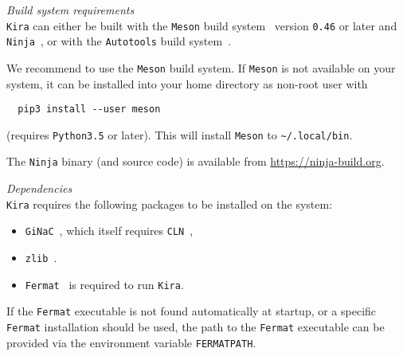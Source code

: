 \documentclass[11pt,a4paper,DIV=11,numbers=noenddot,parskip=half]{scrartcl}
\newcommand{\code}[1]{\texttt{#1}}
\newcommand*{\kira}{\code{Kira}}
\begin{document}
\medskip\pagebreak[2]
\noindent
\textit{Build system requirements}\smallskip\\
\kira{} can either be built with the \code{Meson} build system~\cite{Meson}
version \code{0.46} or later and \code{Ninja}~\cite{Ninja},
or with the \code{Autotools} build system~\cite{Autotools}.

We recommend to use the \code{Meson} build system.
If \code{Meson} is not available on your system, it can be installed into your home directory as non-root user with
\begin{verbatim}
  pip3 install --user meson
\end{verbatim}
(requires \code{Python}\;\code{3.5} or later).
This will install \code{Meson} to \code{\textasciitilde/.local/bin}.

The \code{Ninja} binary (and source code) is available from
\url{https://ninja-build.org}.


\medskip\pagebreak[2]
\noindent
\textit{Dependencies}\smallskip\\
\kira{} requires the following packages to be installed on the system:
%
\begin{itemize}
  \item \code{GiNaC}~\cite{GiNaC,Bauer:2000cp,Vollinga:2005pk}, which itself
    requires \code{CLN}~\cite{CLN},
  \item \code{zlib}~\cite{ZLIB}.
  \item \code{Fermat}~\cite{Fermat} is required to run \kira{}.
\end{itemize}
%
If the \code{Fermat} executable is not found automatically at startup,
or a specific \code{Fermat} installation should be used, the path to the
\code{Fermat} executable can be provided via the environment variable
\code{FERMATPATH}.
\end{document}

